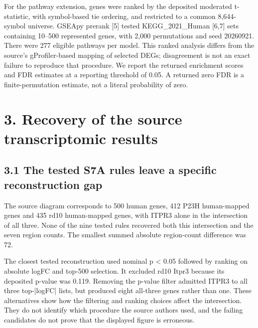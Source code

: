 \documentclass[a4paper,10pt]{article}
\begin{document}
For the pathway extension, genes were ranked by the deposited moderated t-statistic, with symbol-based tie ordering, and restricted to a common 8,644-symbol universe. GSEApy prerank [5] tested KEGG\_2021\_Human [6,7] sets containing 10–500 represented genes, with 2,000 permutations and seed 20260921. There were 277 eligible pathways per model. This ranked analysis differs from the source's gProfiler-based mapping of selected DEGs; disagreement is not an exact failure to reproduce that procedure. We report the returned enrichment scores and FDR estimates at a reporting threshold of 0.05. A returned zero FDR is a finite-permutation estimate, not a literal probability of zero.

\section*{3. Recovery of the source transcriptomic results}
\subsection*{3.1 The tested S7A rules leave a specific reconstruction gap}
The source diagram corresponds to 500 human genes, 412 P23H human-mapped genes and 435 rd10 human-mapped genes, with ITPR3 alone in the intersection of all three. None of the nine tested rules recovered both this intersection and the seven region counts. The smallest summed absolute region-count difference was 72.

The closest tested reconstruction used nominal p < 0.05 followed by ranking on absolute logFC and top-500 selection. It excluded rd10 Itpr3 because its deposited p-value was 0.119. Removing the p-value filter admitted ITPR3 to all three top-|logFC| lists, but produced eight all-three genes rather than one. These alternatives show how the filtering and ranking choices affect the intersection. They do not identify which procedure the source authors used, and the failing candidates do not prove that the displayed figure is erroneous.
\end{document}

